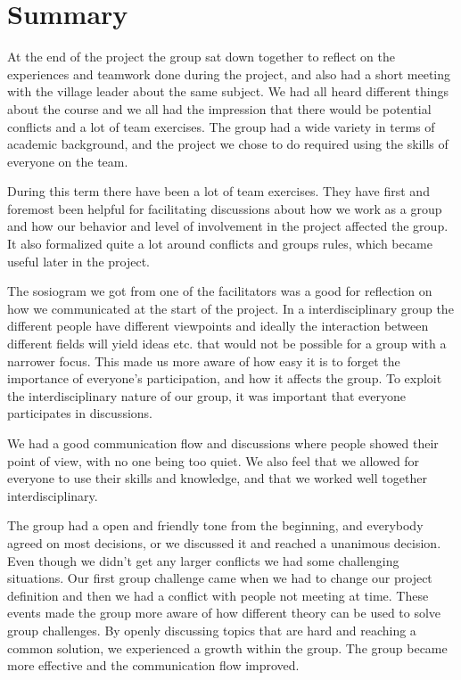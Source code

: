\chapter{Summary}
\label{chap:reflection}
%
At the end of the project the group sat down together to reflect on the experiences and teamwork done during the project, and also had a short meeting with the village leader about the same subject. We had all heard different things about the course and we all had the impression that there would be potential conflicts and a lot of team exercises. The group had a wide variety in terms of academic background, and the project we chose to do required using the skills of everyone on the team.

During this term there have been a lot of team exercises. They have first and foremost been helpful for facilitating discussions about how we work as a group and how our behavior and level of involvement in the project affected the group. It also formalized quite a lot around conflicts and groups rules, which became useful later in the project. 

The sosiogram we got from one of the facilitators was a good for reflection on how we communicated at the start of the project. In a interdisciplinary group the different people have different viewpoints and ideally the interaction between different fields will yield ideas etc. that would not be possible for a group with a narrower focus. This made us more aware of how easy it is to forget the importance of everyone’s participation, and how it affects the group. To exploit the interdisciplinary nature of our group, it was important that everyone participates in discussions. 

We had a good communication flow and discussions where people showed their point of view, with no one being too quiet. We also feel that we allowed for everyone to use their skills and knowledge, and that we worked well together interdisciplinary.

The group had a open and friendly tone from the beginning, and everybody agreed on most decisions, or we discussed it and reached a unanimous decision. Even though we didn't get any larger conflicts we had some challenging situations. Our first group challenge came when we had to change our project definition and then we had a conflict with people not meeting at time. These events made the group more aware of how different theory can be used to solve group challenges. By openly discussing topics that are hard and reaching a common solution, we experienced a growth within the group. The group became more effective and the communication flow improved.

